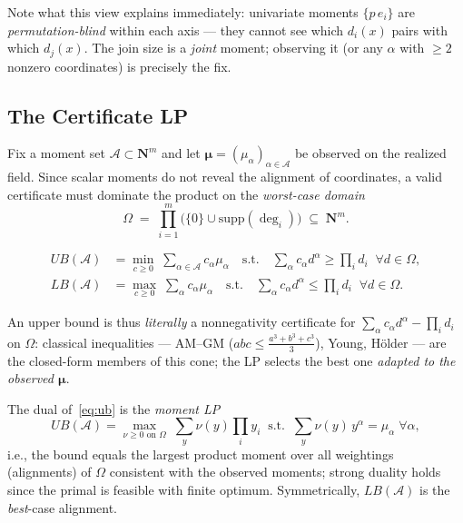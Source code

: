 \noindent Note what this view explains immediately: univariate moments
$\{p\,e_i\}$ are \emph{permutation-blind} within each axis --- they
cannot see which $d_i(x)$ pairs with which $d_j(x)$.  The join size is
a \emph{joint} moment; observing it (or any $\alpha$ with $\ge 2$
nonzero coordinates) is precisely the fix.

\subsection{The Certificate LP}

Fix a moment set $\mathcal{A} \subset \mathbf{N}^m$ and let
$\boldsymbol{\mu} = (\mu_\alpha)_{\alpha\in\mathcal{A}}$ be observed
on the realized field.  Since scalar moments do not reveal the
alignment of coordinates, a valid certificate must dominate the
product on the \emph{worst-case domain}
\begin{equation}
\Omega \;=\; \prod_{i=1}^{m} \big( \{0\} \cup \mathrm{supp}(\deg_i)\big)
\;\subseteq\; \mathbf{N}^m .
\label{eq:omega}
\end{equation}

\begin{definition}
\label{def:cert}
\begin{align}
UB(\mathcal{A}) &= \min_{c \ge 0}\; \sum_{\alpha\in\mathcal{A}} c_\alpha \mu_\alpha
\quad\text{s.t.}\quad \sum_\alpha c_\alpha d^\alpha \ge \prod_i d_i
\;\;\forall d\in\Omega, \label{eq:ub}\\
LB(\mathcal{A}) &= \max_{c \ge 0}\; \sum_\alpha c_\alpha \mu_\alpha
\quad\text{s.t.}\quad \sum_\alpha c_\alpha d^\alpha \le \prod_i d_i
\;\;\forall d\in\Omega. \label{eq:lb}
\end{align}
\end{definition}

\noindent An upper bound is thus \emph{literally} a nonnegativity
certificate for $\sum_\alpha c_\alpha d^\alpha - \prod_i d_i$ on
$\Omega$: classical inequalities --- AM--GM ($abc \le
\frac{a^3+b^3+c^3}{3}$), Young, H\"older --- are the closed-form
members of this cone; the LP selects the best one \emph{adapted to
the observed $\boldsymbol{\mu}$}.

\begin{theorem}
\label{thm:dual}
The dual of~\eqref{eq:ub} is the \emph{moment LP}
\[
UB(\mathcal{A}) = \max_{\nu \ge 0 \text{ on } \Omega}\; \sum_y \nu(y)\prod_i y_i
\;\;\text{s.t.}\;\; \sum_y \nu(y)\, y^\alpha = \mu_\alpha \;\forall\alpha ,
\]
i.e., the bound equals the largest product moment over all weightings
(alignments) of $\Omega$ consistent with the observed moments; strong
duality holds since the primal is feasible with finite optimum.
Symmetrically, $LB(\mathcal{A})$ is the \emph{best}-case alignment.
\end{theorem}

